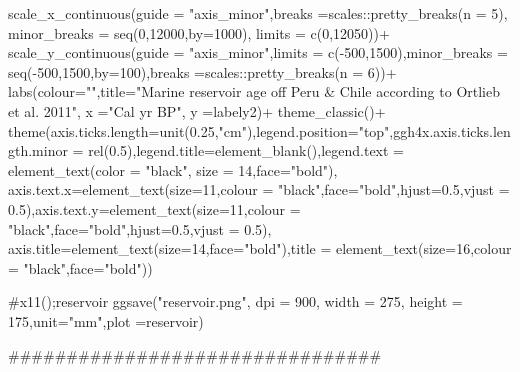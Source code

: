 \documentclass[
]{article}
\newenvironment{Shaded}{\begin{snugshade}}{\end{snugshade}}
\newcommand{\NormalTok}[1]{#1}
\begin{document}
\begin{Shaded}
\begin{Highlighting}[]
\NormalTok{  scale\_x\_continuous(guide = "axis\_minor",breaks =scales::pretty\_breaks(n = 5),}
\NormalTok{                   minor\_breaks = seq(0,12000,by=1000),}
\NormalTok{                   limits = c(0,12050))+}
\NormalTok{  scale\_y\_continuous(guide = "axis\_minor",limits = c({-}500,1500),minor\_breaks = seq({-}500,1500,by=100),breaks =scales::pretty\_breaks(n = 6))+}
\NormalTok{  labs(colour="",title="Marine reservoir age off Peru \& Chile according to Ortlieb et al. 2011",}
\NormalTok{     x ="Cal yr BP", }
\NormalTok{     y =labely2)+}
\NormalTok{  theme\_classic()+}
\NormalTok{  theme(axis.ticks.length=unit(0.25,"cm"),legend.position="top",ggh4x.axis.ticks.length.minor = rel(0.5),legend.title=element\_blank(),legend.text = element\_text(color = "black", size = 14,face="bold"),}
\NormalTok{        axis.text.x=element\_text(size=11,colour = "black",face="bold",hjust=0.5,vjust = 0.5),axis.text.y=element\_text(size=11,colour = "black",face="bold",hjust=0.5,vjust = 0.5),}
\NormalTok{        axis.title=element\_text(size=14,face="bold"),title = element\_text(size=16,colour = "black",face="bold"))}

\NormalTok{\#x11();reservoir}
\NormalTok{ggsave("reservoir.png", dpi = 900,   width = 275,}
\NormalTok{       height = 175,unit="mm",plot =reservoir)}

\NormalTok{\#\#\#\#\#\#\#\#\#\#\#\#\#\#\#\#\#\#\#\#\#\#\#\#\#\#\#\#\#\#\#\#}


\end{Highlighting}
\end{Shaded}
\end{document}
